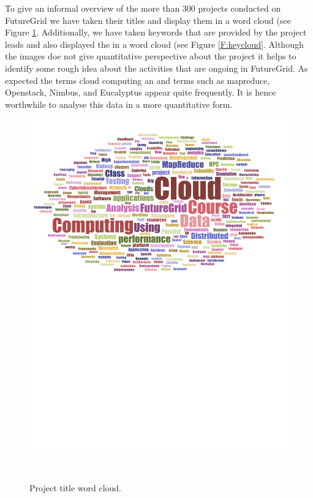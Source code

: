 To give an informal overview of the more than 300 projects conducted
on FutureGrid we have taken their titles and display them in a word
cloud (see Figure \ref{F:wordcloud}. Additionally, we have taken
keywords that are provided by the project leads and also displayed
the in a word cloud (see Figure \ref{F:keycloud}. Although the
images doe not give quantitative perspective about the project it helps
to identify some rough idea about the activities that are ongoing in FutureGrid.
As expected the terms cloud computing an and terms such as mapreduce,
Openstack, Nimbus, and Eucalyptus appear quite frequently. It is hence
worthwhile to analyse this data in a more quantitative form.

\begin{figure}[p]
\begin{minipage}[t]{1.0\textwidth}
  \centering
    \includegraphics[width=1.0\textwidth]{images/fg-title-wordcloud.pdf}
  \caption{Project title word cloud.}\label{F:wordcloud}
\end{minipage}
\vspace{24pt}\\

\end{figure}

